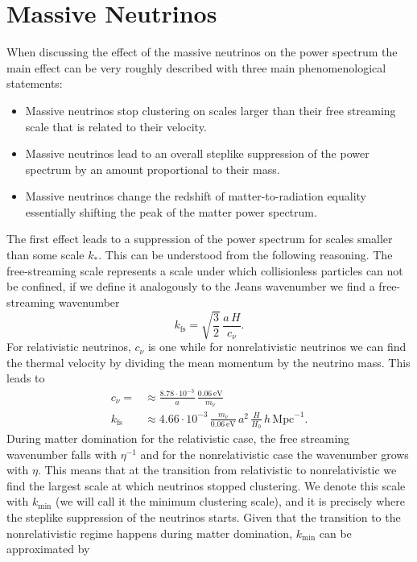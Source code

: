 \documentclass[../main.tex]{subfiles}
\begin{document}
\section{Massive Neutrinos}  
When discussing the effect of the massive neutrinos on the power spectrum the main effect can be very roughly described with three main phenomenological statements:\begin{itemize}
    \item Massive neutrinos stop clustering on scales larger than their free streaming scale that is related to their velocity.
    \item Massive neutrinos lead to an overall steplike suppression of the power spectrum by an amount proportional to their mass.
    \item Massive neutrinos change the redshift of matter-to-radiation equality essentially shifting the peak of the matter power spectrum.
\end{itemize}
The first effect leads to a suppression of the power spectrum for scales smaller than some scale $k_*$. This can be understood from the following reasoning. The free-streaming scale represents a scale under which collisionless particles can not be confined, if we define it analogously to the Jeans wavenumber we find a free-streaming wavenumber 
\begin{equation}
    k_\mathrm{fs} = \sqrt{\frac{3}{2}}\,\frac{a\,H}{c_\nu}.
\end{equation}
For relativistic neutrinos, $c_\nu$ is one while for nonrelativistic neutrinos we can find the thermal velocity by dividing the mean momentum by the neutrino mass. This leads to \begin{align}
    c_\nu =  &\approx \frac{8.78\cdot10^{-3}}{a}\,\frac{0.06\,\mathrm{eV}}{m_\nu} \nonumber \\
    k_\mathrm{fs} &\approx 4.66\cdot10^{-3}\,\frac{m_\nu}{0.06\,\mathrm{eV}}\,a^2\,\frac{H}{H_0}\,h\,\mathrm{Mpc}^{-1}.
\end{align}
During matter domination for the relativistic case, the free streaming wavenumber falls with $\eta^{-1}$ and for the nonrelativistic case the wavenumber grows with $\eta$. This means that at the transition from relativistic to nonrelativistic we find the largest scale at which neutrinos stopped clustering. We denote this scale with $k_\mathrm{min}$ (we will call it the minimum clustering scale), and it is precisely where the steplike suppression of the neutrinos starts. Given that the transition to the nonrelativistic regime happens during matter domination, $k_\mathrm{min}$ can be approximated by 
\end{document}
